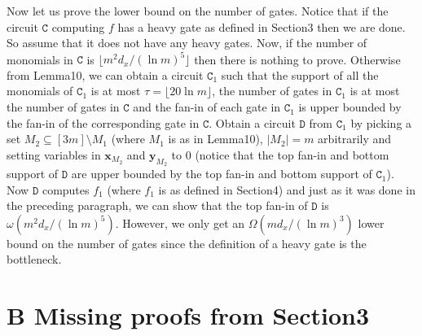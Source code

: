 \documentclass[10pt,a4paper]{article}
\begin{document}
Now let us prove the lower bound on the number of gates. Notice that if the circuit $\mathtt C$ computing $f$ has a heavy gate as defined in Section3 then we are done. So assume that it does not have any heavy gates. Now, if the number of monomials in $\mathtt C$ is $\lfloor m^2d_x/(\ln m)^5\rfloor$ then there is nothing to prove. Otherwise from Lemma10, we can obtain a circuit $\mathtt C_1$ such that the support of all the monomials of $\mathtt C_1$ is at most $\tau=\lfloor20\ln m\rfloor$, the number of gates in $\mathtt C_1$ is at most the number of gates in $\mathtt C$ and the fan-in of each gate in $\mathtt C_1$ is upper bounded by the fan-in of the corresponding gate in $\mathtt C$. Obtain a circuit $\mathtt D$ from $\mathtt C_1$ by picking a set $M_2\subseteq[3m]\setminus M_1$ (where $M_1$ is as in Lemma10), $|M_2|=m$ arbitrarily and setting variables in $\mathbf x_{M_2}$ and $\mathbf y_{M_2}$ to 0 (notice that the top fan-in and bottom support of $\mathtt D$ are upper bounded by the top fan-in and bottom support of $\mathtt C_1$). Now $\mathtt D$ computes $f_1$ (where $f_1$ is as defined in Section4) and just as it was done in the preceding paragraph, we can show that the top fan-in of $\mathtt D$ is $\omega(m^2d_x/(\ln m)^5)$. However, we only get an $\Omega(md_x/(\ln m)^3)$ lower bound on the number of gates since the definition of a heavy gate is the bottleneck.

\section*{B Missing proofs from Section3}
\end{document}
